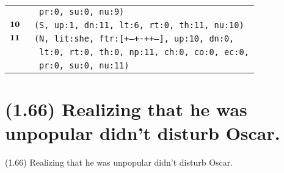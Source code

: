 \documentclass{article}
\begin{document}
\begin{minipage}{\textwidth}
{\begin{tabular}{|r|l|}
    & \texttt{\texttt{~pr:0,~su:0,~nu:9)}} \\
    ${\textbf{\textrm{10}}_{\phantom{z}}}$ & \texttt{\texttt{(S,~up:1,~dn:11,~lt:6,~rt:0,~th:11,~nu:10)}} \\
    ${\textbf{\textrm{11}}_{\phantom{z}}}$ & \texttt{\texttt{(N,~lit:she,~ftr:[+--+-++--],~up:10,~dn:0,}} \\
    & \texttt{\texttt{~lt:0,~rt:0,~th:0,~np:11,~ch:0,~co:0,~ec:0,}} \\
    & \texttt{\texttt{~pr:0,~su:0,~nu:11)}} \\
    \hline
  \end{tabular}
  }
\end{minipage}
\bigbreak

\clearpage

%
%

\section*{(1.66) Realizing that he was unpopular didn't disturb Oscar.}

\bigbreak
\begin{enumerate*}
\item[(1.66)] Realizing that he was unpopular didn't disturb Oscar.
\end{enumerate*}
\bigbreak
\end{document}
